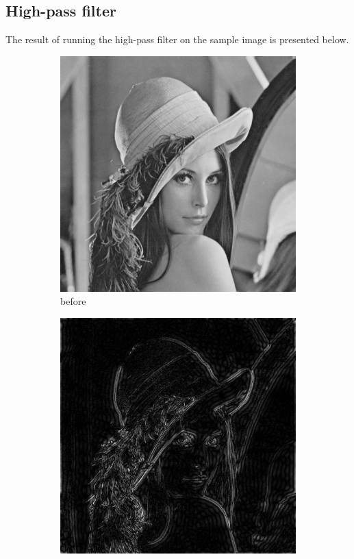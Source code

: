 \documentclass[12pt]{article}
\begin{document}
\subsection{High-pass filter}
The result of running the high-pass filter on the sample image is presented below.
\begin{figure}[H]\centering
    \begin{subfigure}[t]{\subfiguresize}\centering
        \includegraphics[width=\textwidth]{img/lena.png}
        \caption{before}
    \end{subfigure}
    \hspace{2em}
    \begin{subfigure}[t]{\subfiguresize}\centering
        \includegraphics[width=\textwidth]{img/lena_highpass.png}

\end{subfigure}
\end{figure}
\end{document}
